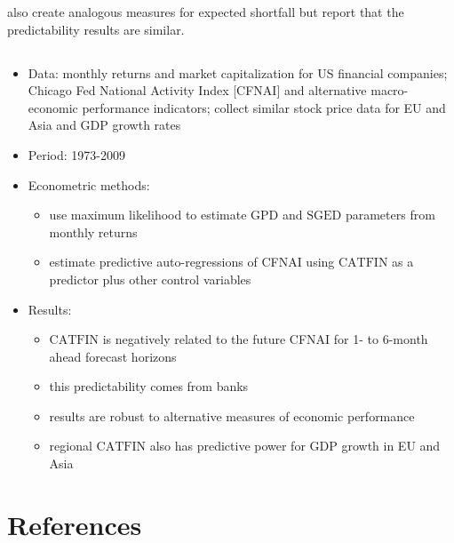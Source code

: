 \documentclass[authoryear]{elsarticle}
\newcommand{\bi}{\begin{itemize}}
\newcommand{\ei}{\end{itemize}}
\renewcommand{\i}{\item}
\newcommand{\cat}{\ensuremath{\mathrm{CATFIN}}}
\newcommand{\sged}{\ensuremath{\mathrm{SGED}}}
\newcommand{\gpd}{\ensuremath{\mathrm{GPD}}}
\begin{document}
\cite{Allen2012} also create analogous measures for expected shortfall but report that the predictability results are similar.
 
\subsection{\cite{Allen2012}}
\bi
\i Data:  monthly returns and market capitalization for US financial companies; Chicago Fed National Activity Index [CFNAI] and alternative macro-economic performance indicators; collect similar stock price data for EU and Asia and GDP growth rates 
\i Period:  1973-2009  
\i Econometric methods:  
\bi
\i use maximum likelihood to estimate $\gpd$ and $\sged$ parameters from monthly returns
\i estimate predictive auto-regressions of CFNAI using $\cat$ as a predictor plus other control variables
\ei

\i Results:
\bi
\i $\cat$ is negatively related to the future CFNAI for 1- to 6-month ahead forecast horizons 
\i this predictability comes from banks
\i results are robust to alternative measures of economic performance
\i regional $\cat$ also has predictive power for GDP growth in EU and Asia
\ei
\ei

\section*{References}


\end{document}
